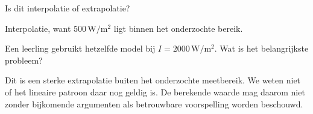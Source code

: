 \documentclass{ximera}
\begin{document}
\begin{oefening}{\oefU \ESS}
\begin{question}
Is dit interpolatie of extrapolatie?

\begin{oplossing}
Interpolatie, want $500\,\mathrm{W/m^2}$ ligt binnen het onderzochte
bereik.
\end{oplossing}
\end{question}

\begin{question}
Een leerling gebruikt hetzelfde model bij
$I=2000\,\mathrm{W/m^2}$. Wat is het belangrijkste probleem?

\begin{oplossing}
Dit is een sterke extrapolatie buiten het onderzochte meetbereik.
We weten niet of het lineaire patroon daar nog geldig is. De berekende
waarde mag daarom niet zonder bijkomende argumenten als betrouwbare
voorspelling worden beschouwd.
\end{oplossing}
\end{question}
\end{oefening}
\end{document}
